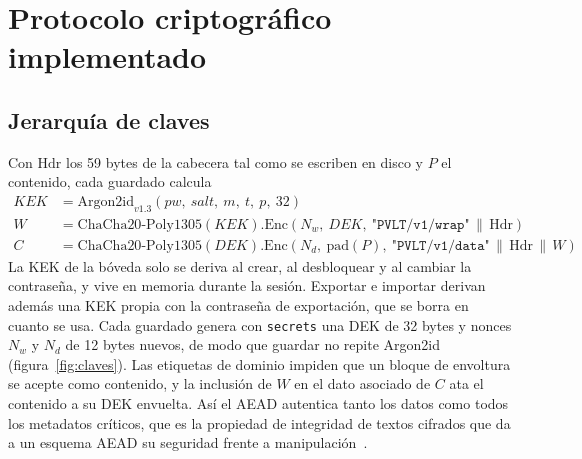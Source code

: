 \documentclass[11pt,letterpaper]{article}
\newcommand{\code}[1]{\texttt{#1}}
\begin{document}
\section{Protocolo criptográfico implementado}\label{sec:protocolo}

\subsection{Jerarquía de claves}

Con $\mathrm{Hdr}$ los 59 bytes de la cabecera tal como se escriben en disco y $P$ el contenido, cada guardado calcula
\begin{align*}
\mathit{KEK} &= \mathrm{Argon2id}_{v1.3}(pw,\ salt,\ m,\ t,\ p,\ 32)\\
W &= \mathrm{ChaCha20\text{-}Poly1305}(\mathit{KEK}).\mathrm{Enc}(N_w,\ \mathit{DEK},\ \texttt{"PVLT/v1/wrap"} \,\|\, \mathrm{Hdr})\\
C &= \mathrm{ChaCha20\text{-}Poly1305}(\mathit{DEK}).\mathrm{Enc}(N_d,\ \mathrm{pad}(P),\ \texttt{"PVLT/v1/data"} \,\|\, \mathrm{Hdr} \,\|\, W)
\end{align*}
La KEK de la bóveda solo se deriva al crear, al desbloquear y al cambiar la contraseña, y vive en memoria durante la sesión. Exportar e importar derivan además una KEK propia con la contraseña de exportación, que se borra en cuanto se usa. Cada guardado genera con \code{secrets} una DEK de 32 bytes y nonces $N_w$ y $N_d$ de 12 bytes nuevos, de modo que guardar no repite Argon2id (figura~\ref{fig:claves}). Las etiquetas de dominio impiden que un bloque de envoltura se acepte como contenido, y la inclusión de $W$ en el dato asociado de $C$ ata el contenido a su DEK envuelta. Así el AEAD autentica tanto los datos como todos los metadatos críticos, que es la propiedad de integridad de textos cifrados que da a un esquema AEAD su seguridad frente a manipulación~\cite[§9.5]{boneh}.
\end{document}
